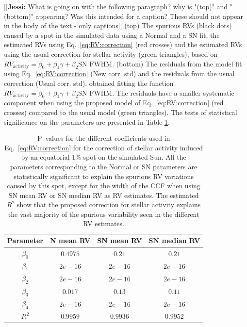\documentclass{aa}
\newcommand{\jessi}[1]{{\color{Purple}[[\textbf{Jessi: }#1]]}}
\begin{document}
\jessi{What is going on with the following paragraph?  why is "(top)" and "(bottom)" appearing?  Was this intended for a caption?  These should not appear in the body of the text - only captions} (top) The spurious RVs (black dots) caused by a spot in the simulated data using a Normal and a SN fit, the estimated RVs using Eq.~\ref{eq:RV:correction} (red crosses) and the estimated RVs using the usual correction for stellar activity (green triangles), based on $RV_{\text{activity}}=\beta_0+\beta_1 \gamma + \beta_2 \text{SN FWHM}$.
 (bottom) The residuals from the model fit using Eq.~\ref{eq:RV:correction} (New corr. std) and the residuals from the usual correction (Usual corr. std), obtained fitting the function $RV_{\text{activity}}=\beta_0+\beta_1 \gamma + \beta_2 \text{SN FWHM}$.  The residuals have a smaller systematic component when using the proposed model of 
  Eq.~\ref{eq:RV:correction} (red crosses) compared to the usual model (green triangles).
The tests of statistical significance on the parameters are presented in Table \ref{table:spot.test}.

\begin{table}
\begin{center}
\caption{P--values for the different coefficients used in Eq.~\ref{eq:RV:correction} for the correction of stellar activity induced by an equatorial 1\% spot on the simulated Sun. All the parameters corresponding to the Normal or SN parameters are statistically significant to explain the spurious RV variations caused by this spot, except for the width of the CCF when using SN mean RV or SN median RV as RV estimates. The estimated $R^{2}$ show that the proposed correction for stellar activity explains the vast majority of the spurious variability seen in the different RV estimates.}
\label{table:spot.test}
\begin{tabular}{|c|c|c|c|}
\hline
Parameter          & N mean RV         &   SN mean RV &   SN median RV \\
\hline
$\beta_{0}$            &    $0.4975$    & $0.21$ & $0.21$ \\
\hline
$\beta_{1}$            &    $2e-16$    & $2e-16$ & $2e-16$ \\
\hline
$\beta_{2}$            &     $2e-16$   &  $2e-16$ & $2e-16$\\
\hline
$\beta_{3}$            &     $0.017$   &  $0.13$ & $0.11$\\
\hline
$\beta_{4}$            &     $2e-16$   &  $2e-16$ & $2e-16$\\
\hline
$R^{2}$      &     $0.9959$    &  $0.9936$ & $0.9952$  \\
\hline
\end{tabular}
\end{center}
\end{table}
\end{document}

